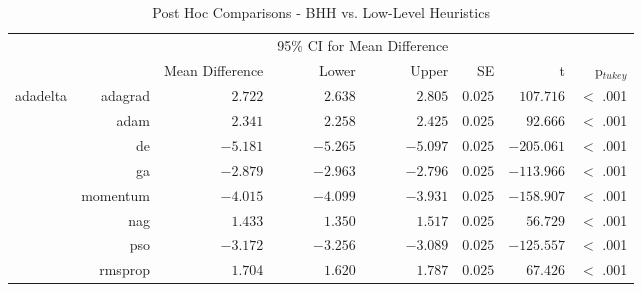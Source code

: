 \begin{table}[htb]
	\centering
	\caption{Post Hoc Comparisons - BHH vs. Low-Level Heuristics}
	\label{tab:results:standalone:post_hoc}%
	\par\bigskip
	\resizebox{\textwidth}{!}
	{
		\begin{tabular}{lrrrrrrr}
			\toprule
			\multicolumn{1}{c}{} & \multicolumn{1}{c}{} & \multicolumn{1}{c}{} & \multicolumn{2}{c}{95\% CI for Mean Difference} & \multicolumn{1}{c}{} & \multicolumn{1}{c}{} & \multicolumn{1}{c}{}               \\
			\cline{4-5}
			$ $                  & $ $                  & Mean Difference      & Lower                                           & Upper                & SE                   & t                    & p$_{tukey}$ \\
			\cmidrule[0.4pt]{1-8}
			adadelta             & adagrad              & $2.722$              & $2.638$                                         & $2.805$              & $0.025$              & $107.716$            & $<$ .001    \\
			$ $                  & adam                 & $2.341$              & $2.258$                                         & $2.425$              & $0.025$              & $92.666$             & $<$ .001    \\
			                     & de                   & $-5.181$             & $-5.265$                                        & $-5.097$             & $0.025$              & $-205.061$           & $<$ .001    \\
			                     & ga                   & $-2.879$             & $-2.963$                                        & $-2.796$             & $0.025$              & $-113.966$           & $<$ .001    \\
			                     & momentum             & $-4.015$             & $-4.099$                                        & $-3.931$             & $0.025$              & $-158.907$           & $<$ .001    \\
			                     & nag                  & $1.433$              & $1.350$                                         & $1.517$              & $0.025$              & $56.729$             & $<$ .001    \\
			                     & pso                  & $-3.172$             & $-3.256$                                        & $-3.089$             & $0.025$              & $-125.557$           & $<$ .001    \\
			                     & rmsprop              & $1.704$              & $1.620$                                         & $1.787$              & $0.025$              & $67.426$             & $<$ .001    \\

\end{tabular}}
\end{table}
